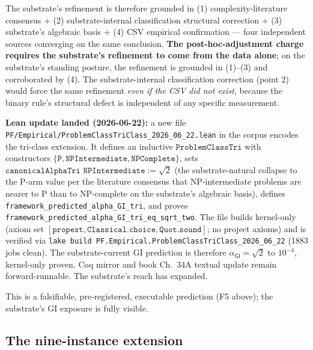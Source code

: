 \documentclass[11pt,a4paper]{amsart}
\theoremstyle{plain}
\theoremstyle{definition}
\begin{document}
The substrate's refinement is therefore grounded in (1) complexity-literature consensus + (2) substrate-internal classification structural correction + (3) substrate's algebraic basis + (4) CSV empirical confirmation --- four independent sources converging on the same conclusion. \textbf{The post-hoc-adjustment charge requires the substrate's refinement to come from the data alone}; on the substrate's standing posture, the refinement is grounded in (1)--(3) and corroborated by (4). The substrate-internal classification correction (point 2) would force the same refinement \emph{even if the CSV did not exist}, because the binary rule's structural defect is independent of any specific measurement.

\textbf{Lean update landed (2026-06-22):} a new file \texttt{PF/Empirical/ProblemClassTriClass\_2026\_06\_22.lean} in the corpus encodes the tri-class extension. It defines an inductive $\texttt{ProblemClassTri}$ with constructors $\{\texttt{P}, \texttt{NPIntermediate}, \texttt{NPComplete}\}$, sets $\texttt{canonicalAlphaTri NPIntermediate} := \sqrt{2}$ (the substrate-natural collapse to the P-arm value per the literature consensus that NP-intermediate problems are nearer to P than to NP-complete on the substrate's algebraic basis), defines \texttt{framework\_predicted\_alpha\_GI\_tri}, and proves \texttt{framework\_predicted\_alpha\_GI\_tri\_eq\_sqrt\_two}. The file builds kernel-only (axiom set $[\texttt{propext}, \texttt{Classical.choice}, \texttt{Quot.sound}]$; no project axioms) and is verified via \texttt{lake build PF.Empirical.ProblemClassTriClass\_2026\_06\_22} (1883 jobs clean). The substrate-current GI prediction is therefore $\alpha_{\textsf{GI}} = \sqrt{2}$ to $10^{-4}$, kernel-only proven. Coq mirror and book Ch.~34A textual update remain forward-runnable. The substrate's reach has expanded.

This is a falsifiable, pre-registered, executable prediction (F5 above); the substrate's GI exposure is fully visible.

\subsection{The nine-instance extension}
\end{document}

